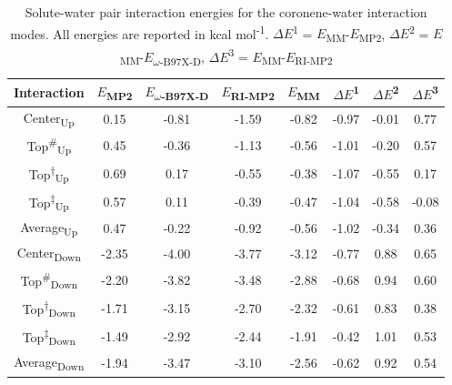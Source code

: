     \vspace{2em}
    
    \begin{table}
        \centering
        \small
        \caption[Solute-water pair interaction energies for the coronene - water interaction modes]{Solute-water pair interaction energies for the coronene-water interaction modes. All energies are reported in kcal mol\textsuperscript{-1}. $\Delta{E}$\textsuperscript{1} = $E$\textsubscript{MM}-$E$\textsubscript{MP2}, $\Delta{E}$\textsuperscript{2} = $E$\textsubscript{MM}-$E$\textsubscript{$\omega$-B97X-D}, $\Delta{E}$\textsuperscript{3} = $E$\textsubscript{MM}-$E$\textsubscript{RI-MP2}}
            \begin{tabular}{cccccccc}
                \toprule
                Interaction                 &   $E$\textsubscript{MP2}     &    $E$\textsubscript{$\omega$-B97X-D}  &   $E$\textsubscript{RI-MP2}   &   $E$\textsubscript{MM}   &   $\Delta{E}$\textsuperscript{1}  &   $\Delta{E}$\textsuperscript{2}  &   $\Delta{E}$\textsuperscript{3}  \\ \midrule
                Center\textsubscript{Up}    &   0.15    &   -0.81   &   -1.59   &   -0.82   &   -0.97   &   -0.01   &   0.77    \\
                Top\textsuperscript{\#}\textsubscript{Up}   &   0.45  & -0.36 & -1.13 & -0.56 & -1.01 & -0.20 & 0.57 \\
                Top\textsuperscript{$\dagger$}\textsubscript{Up}   &    0.69  & 0.17  & -0.55 & -0.38 & -1.07 & -0.55 & 0.17  \\    
                Top\textsuperscript{$\ddagger$}\textsubscript{Up}   &   0.57  & 0.11  & -0.39 & -0.47 & -1.04 & -0.58 & -0.08  \\    
                Average\textsubscript{Up}   &   0.47  & -0.22 & -0.92 & -0.56 & -1.02 & -0.34 & 0.36    \\  
                Center\textsubscript{Down}    & -2.35 & -4.00 & -3.77 & -3.12 & -0.77 & 0.88  & 0.65    \\
                Top\textsuperscript{\#}\textsubscript{Down}   & -2.20 & -3.82 & -3.48 & -2.88 & -0.68 & 0.94  & 0.60 \\
                Top\textsuperscript{$\dagger$}\textsubscript{Down}   &  -1.71 & -3.15 & -2.70 & -2.32 & -0.61 & 0.83  & 0.38  \\    
                Top\textsuperscript{$\ddagger$}\textsubscript{Down}   & -1.49 & -2.92 & -2.44 & -1.91 & -0.42 & 1.01  & 0.53  \\    
                Average\textsubscript{Down}   & -1.94 & -3.47 & -3.10 & -2.56 & -0.62 & 0.92  & 0.54  \\    \bottomrule 
            \end{tabular}
        \label{tab:my_label}
    \end{table}

